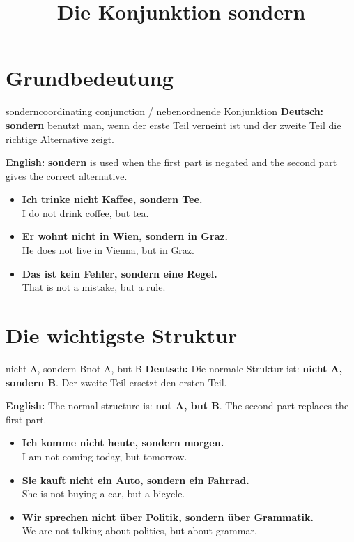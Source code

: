 \documentclass[a4paper,11pt]{article}
\title{Die Konjunktion \glqq sondern\grqq}
\date{}
\newcommand{\GermanText}[1]{\textbf{Deutsch: }#1\par}
\newcommand{\EnglishText}[1]{{\small\color{SoftGray}\textbf{English: }#1\par}}
\newcommand{\ExampleItem}[2]{\item \textbf{#1}\\{\small\color{SoftGray}#2}}
\begin{document}
    \maketitle
    \tableofcontents
    \newpage

\section{Grundbedeutung}

\begin{grammarentry}{sondern}{coordinating conjunction / nebenordnende Konjunktion}
\GermanText{\textbf{sondern} benutzt man, wenn der erste Teil verneint ist und der zweite Teil die richtige Alternative zeigt.}
\EnglishText{\textbf{sondern} is used when the first part is negated and the second part gives the correct alternative.}

\begin{exbox}
\begin{itemize}
    \ExampleItem{Ich trinke nicht Kaffee, sondern Tee.}{I do not drink coffee, but tea.}
    \ExampleItem{Er wohnt nicht in Wien, sondern in Graz.}{He does not live in Vienna, but in Graz.}
    \ExampleItem{Das ist kein Fehler, sondern eine Regel.}{That is not a mistake, but a rule.}
\end{itemize}
\end{exbox}
\end{grammarentry}

\section{Die wichtigste Struktur}

\begin{grammarentry}{nicht A, sondern B}{not A, but B}
\GermanText{Die normale Struktur ist: \textbf{nicht A, sondern B}. Der zweite Teil ersetzt den ersten Teil.}
\EnglishText{The normal structure is: \textbf{not A, but B}. The second part replaces the first part.}

\begin{exbox}
\begin{itemize}
    \ExampleItem{Ich komme nicht heute, sondern morgen.}{I am not coming today, but tomorrow.}
    \ExampleItem{Sie kauft nicht ein Auto, sondern ein Fahrrad.}{She is not buying a car, but a bicycle.}
    \ExampleItem{Wir sprechen nicht über Politik, sondern über Grammatik.}{We are not talking about politics, but about grammar.}
\end{itemize}
\end{exbox}
\end{grammarentry}
\end{document}
